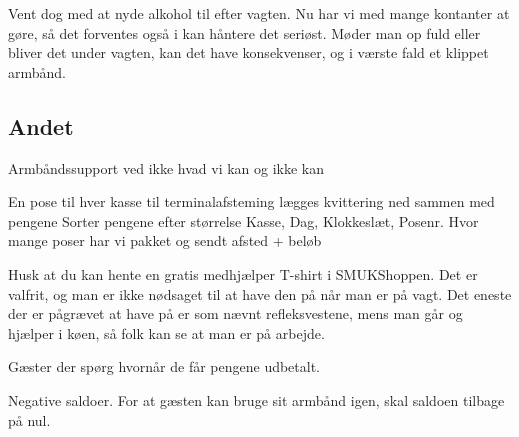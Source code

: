 Vent dog med at nyde alkohol til efter vagten. Nu har vi med mange kontanter at gøre, 
så det forventes også i kan håntere det seriøst. 
Møder man op fuld eller bliver det under vagten, kan det have konsekvenser, og i 
værste fald et klippet armbånd.

\subsection{Andet}
\label{sec:intra:andet}

Armbåndssupport ved ikke hvad vi kan
og ikke kan

En pose til hver kasse
til terminalafsteming lægges kvittering ned sammen med pengene
Sorter pengene efter størrelse
Kasse, Dag, Klokkeslæt, Posenr.
Hvor mange poser har vi pakket og sendt afsted + beløb 

Husk at du kan hente en gratis medhjælper T-shirt i SMUKShoppen. Det er valfrit, og man 
er ikke nødsaget til at have den på når man er på vagt. Det eneste der er pågrævet at 
have på er som nævnt refleksvestene, mens man går og hjælper i køen, så folk kan se at 
man er på arbejde.

Gæster der spørg hvornår de får pengene udbetalt.

Negative saldoer. For at gæsten kan bruge sit armbånd igen, skal saldoen tilbage på nul.